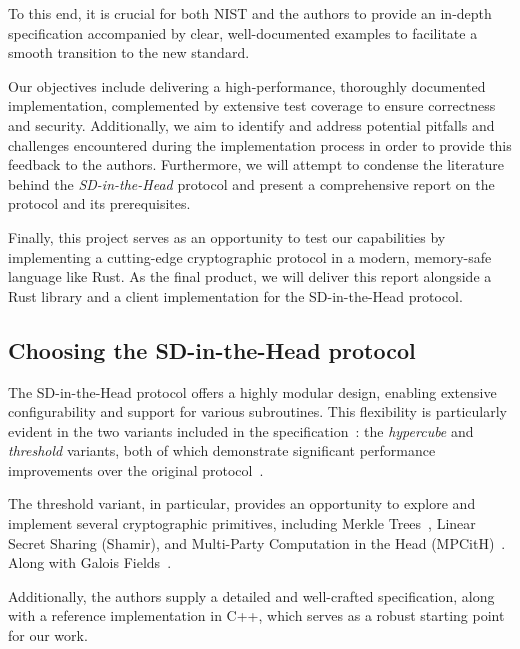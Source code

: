 \documentclass[11pt]{report}
\theoremstyle{definition}
\theoremstyle{plain}
\begin{document}
To this end, it is crucial for both NIST and the authors to provide an in-depth specification accompanied by clear, well-documented examples to facilitate a smooth transition to the new standard.

Our objectives include delivering a high-performance, thoroughly documented implementation, complemented by extensive test coverage to ensure correctness and security. Additionally, we aim to identify and address potential pitfalls and challenges encountered during the implementation process in order to provide this feedback to the authors. Furthermore, we will attempt to condense the literature behind the \emph{SD-in-the-Head} protocol and present a comprehensive report on the protocol and its prerequisites.

Finally, this project serves as an opportunity to test our capabilities by implementing a cutting-edge cryptographic protocol in a modern, memory-safe language like Rust. As the final product, we will deliver this report alongside a Rust library and a client implementation for the SD-in-the-Head protocol.


\subsection{Choosing the SD-in-the-Head protocol}
The SD-in-the-Head protocol offers a highly modular design, enabling extensive configurability and support for various subroutines. This flexibility is particularly evident in the two variants included in the specification~\cite{aguilarsyndrome11}: the \textit{hypercube} and \textit{threshold} variants, both of which demonstrate significant performance improvements over the original protocol~\cite{feneuil2022syndrome,aguilar2023return,feneuil2023threshold}.

The threshold variant, in particular, provides an opportunity to explore and implement several cryptographic primitives, including Merkle Trees~\cite{becker2008merkle}, Linear Secret Sharing (Shamir), and Multi-Party Computation in the Head (MPCitH)~\cite{baum2020concretely}. Along with Galois Fields~\cite{brownadvanced}.

Additionally, the authors supply a detailed and well-crafted specification, along with a reference implementation in C++, which serves as a robust starting point for our work.
\end{document}
